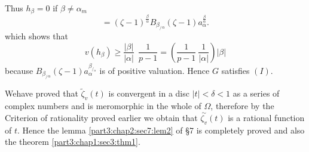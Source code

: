 Thus $h_\beta = 0$ if $\beta \neq \alpha_m$
$$
=(\zeta -1)^{\frac{\beta}{\alpha}} B_{\beta_/{_\alpha}} (\zeta-1)
a_\alpha^{\frac{\beta}{\alpha}}. 
$$
which shows that 
$$
v(h_\beta) \geq \frac{|\beta|}{|\alpha|} ~ ~ \frac{1}{p-1} =
\left(\frac{1}{p-1} ~ \frac{1}{|\alpha|}\right) |\beta| 
$$
because $B_{\beta_/{_\alpha}} (\zeta -1)
a_\alpha^{\beta_{/{_\alpha}}}$ is of positive valuation. Hence $G$
satisfies $(I)$. 

We\pageoriginale have proved that $\tilde{\zeta}_v (t)$ is convergent in a
disc $|t| < \delta < 1$ as a series of complex numbers and is
meromorphic in the whole of $\Omega$, therefore by the Criterion of
rationality proved earlier we obtain that $\overset{\sim}{\zeta_v}(t)$
is a rational function of $t$. Hence the lemma
\ref{part3:chap2:sec7:lem2} of \S 7 is 
completely proved and also the theorem \ref{part3:chap1:sec3:thm1}. 


